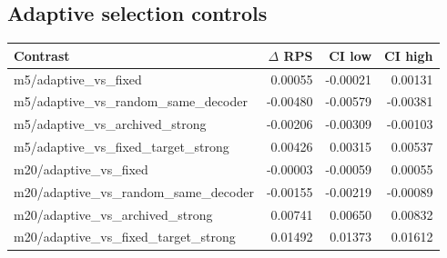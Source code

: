 \documentclass[10pt]{article}
\begin{document}
\subsection{Adaptive selection controls}
\begin{longtable}{p{.49\linewidth}rrr}\toprule Contrast & $\Delta$ RPS & CI low & CI high\\\midrule\endhead
m5/adaptive\_vs\_fixed & 0.00055 & -0.00021 & 0.00131\\
m5/adaptive\_vs\_random\_same\_decoder & -0.00480 & -0.00579 & -0.00381\\
m5/adaptive\_vs\_archived\_strong & -0.00206 & -0.00309 & -0.00103\\
m5/adaptive\_vs\_fixed\_target\_strong & 0.00426 & 0.00315 & 0.00537\\
m20/adaptive\_vs\_fixed & -0.00003 & -0.00059 & 0.00055\\
m20/adaptive\_vs\_random\_same\_decoder & -0.00155 & -0.00219 & -0.00089\\
m20/adaptive\_vs\_archived\_strong & 0.00741 & 0.00650 & 0.00832\\
m20/adaptive\_vs\_fixed\_target\_strong & 0.01492 & 0.01373 & 0.01612\\
\bottomrule\end{longtable}
\end{document}
